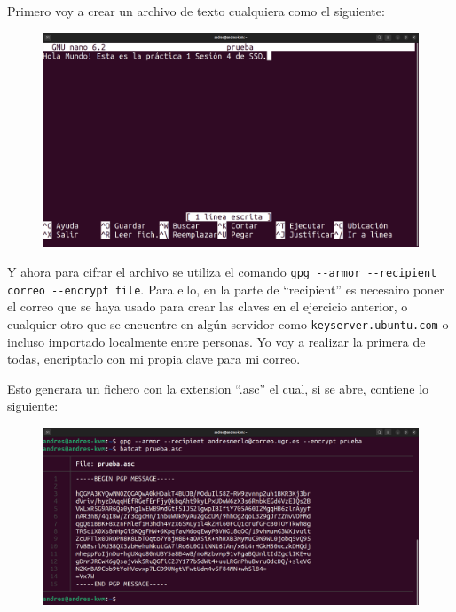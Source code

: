 \documentclass{article}
\begin{document}
Primero voy a crear un archivo de texto cualquiera como el siguiente:

\begin{figure}[H]
    \includegraphics[width=\textwidth]{imagenes/Captura desde 2022-10-19 16-57-15.png}
\end{figure}

Y ahora para cifrar el archivo se utiliza el comando \verb|gpg --armor --recipient correo --encrypt file|. Para ello, en la parte de ``recipient'' es necesairo poner el correo que se haya usado para crear las claves en el ejercicio anterior, o cualquier otro que se encuentre en algún servidor como \verb|keyserver.ubuntu.com| o incluso importado localmente entre personas. Yo voy a realizar la primera de todas, encriptarlo con mi propia clave para mi correo.

Esto generara un fichero con la extension ``.asc'' el cual, si se abre, contiene lo siguiente:

\begin{figure}[H]
    \includegraphics[width=\textwidth]{imagenes/Portatil/Captura desde 2022-10-27 18-34-40.png}
\end{figure}
\end{document}
